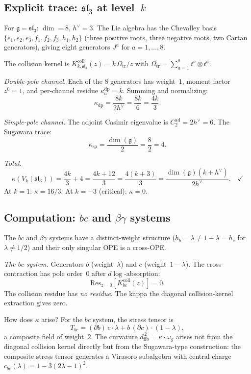\documentclass[11pt,reqno]{amsart}
\theoremstyle{definition}
\theoremstyle{remark}
\newcommand{\fg}{\mathfrak{g}}
\newcommand{\Res}{\mathrm{Res}}
\newcommand{\dfib}{d_{\mathrm{fib}}}
\numberwithin{equation}{section}
\begin{document}
\subsection{Explicit trace: $\mathfrak{sl}_3$ at level~$k$}
\label{subsec:sl3-explicit}

For $\fg = \mathfrak{sl}_3$: $\dim = 8$, $h^\vee = 3$.
The Lie algebra has the Chevalley basis
$\{e_1,e_2,e_3,f_1,f_2,f_3,h_1,h_2\}$ (three positive roots,
three negative roots, two Cartan generators), giving eight
generators $J^a$ for $a = 1,\ldots,8$.

The collision kernel is
$K_{k,\mathfrak{sl}_3}^{\mathrm{coll}}(z)
=k\,\Omega_{\mathrm{tr}}/z$ with
$\Omega_{\mathrm{tr}} = \sum_{a=1}^8
t^a \otimes t^a$.

\medskip\noindent
\emph{Double-pole channel.}
Each of the $8$ generators has weight~$1$, moment factor
$z^0 = 1$, and per-channel residue
$\kappa_a^{\mathrm{dp}} = k$. Summing and normalizing:
\[
\kappa_{\mathrm{dp}} = \frac{8k}{2h^\vee} = \frac{8k}{6}
= \frac{4k}{3}.
\]

\medskip\noindent
\emph{Simple-pole channel.}
The adjoint Casimir eigenvalue is
$C_2^{\mathrm{ad}} = 2h^\vee = 6$. The Sugawara trace:
\[
\kappa_{\mathrm{sp}} = \frac{\dim(\fg)}{2} = \frac{8}{2} = 4.
\]

\medskip\noindent
\emph{Total.}
\[
\kappa(V_k(\mathfrak{sl}_3)) = \frac{4k}{3} + 4
= \frac{4k + 12}{3} = \frac{4(k+3)}{3}
= \frac{\dim(\fg)(k+h^\vee)}{2h^\vee}.\quad\checkmark
\]
At $k = 1$: $\kappa = 16/3$. At $k = -3$ (critical):
$\kappa = 0$.

\subsection{Computation: $bc$ and $\beta\gamma$ systems}
\label{subsec:av-bc-bg}

The $bc$ and $\beta\gamma$ systems have a distinct-weight
structure ($h_b = \lambda \neq 1-\lambda = h_c$ for
$\lambda \neq 1/2$) and their only singular OPE is a
cross-OPE.

\medskip\noindent
\emph{The $bc$ system.}
Generators $b$ (weight~$\lambda$) and $c$
(weight~$1{-}\lambda$).
The cross-contraction has pole order~$0$ after $d\log$-absorption:
\[
\Res_{z=0}[K_{bc}^{\mathrm{coll}}(z)] = 0.
\]
The collision residue has \emph{no residue}. The kappa
the diagonal collision-kernel extraction gives zero.

How does $\kappa$ arise? For the $bc$ system, the stress
tensor is
\[
T_{bc} = (\partial b)\,c\cdot\lambda + b\,(\partial c)
\cdot(1-\lambda),
\]
a composite field of weight~$2$. The curvature
$\dfib^{\,2} = \kappa\cdot\omega_g$ arises not from the
diagonal collision kernel directly
but from the Sugawara-type construction: the composite stress
tensor generates a Virasoro subalgebra with central charge
$c_{bc}(\lambda) = 1 - 3(2\lambda-1)^2$.
\end{document}
